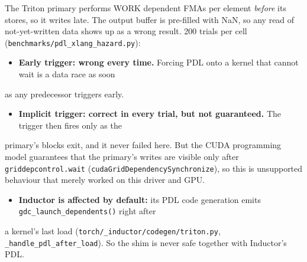 \documentclass[10pt]{article}
\begin{document}
The Triton primary performs WORK dependent FMAs per element \emph{before} its stores, so it writes late. The output buffer is pre-filled with NaN, so any read of not-yet-written data shows up as a wrong result. 200 trials per cell (\texttt{benchmarks/pdl\_xlang\_hazard.py}):


\begin{table}[H]\centering\small
{}
\end{table}

\begin{itemize}
\item \textbf{Early trigger: wrong every time.} Forcing PDL onto a kernel that cannot wait is a data race as soon
\end{itemize}
as any predecessor triggers early.

\begin{itemize}
\item \textbf{Implicit trigger: correct in every trial, but not guaranteed.} The trigger then fires only as the
\end{itemize}
primary's blocks exit, and it never failed here. But the CUDA programming model guarantees that the primary's writes are visible only after \texttt{griddepcontrol.wait} (\texttt{cudaGridDependencySynchronize}), so this is unsupported behaviour that merely worked on this driver and GPU.

\begin{itemize}
\item \textbf{Inductor is affected by default:} its PDL code generation emits \texttt{gdc\_launch\_dependents()} right after
\end{itemize}
a kernel's last load (\texttt{torch/\_inductor/codegen/triton.py}, \texttt{\_handle\_pdl\_after\_load}). So the shim is never safe together with Inductor's PDL.
\end{document}
